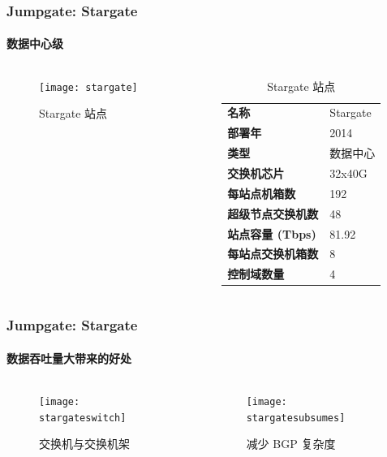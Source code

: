 \begin{frame}
    \frametitle{Jumpgate: Stargate}
    \framesubtitle{数据中心级}
    \begin{columns}
        \begin{column}{0.4\textwidth}
            \begin{figure}
                \texttt{[image: stargate]}
                \caption{Stargate 站点}
            \end{figure}
        \end{column}
        \begin{column}{0.6\textwidth}
            \begin{table}
                \begin{tabular}{>{\bfseries}ll}
                    \toprule
                    名称             & Stargate \\
                    部署年           & 2014     \\
                    类型             & 数据中心 \\
                    交换机芯片       & 32x40G   \\
                    每站点机箱数     & 192      \\
                    超级节点交换机数 & 48       \\
                    站点容量 (Tbps)  & 81.92    \\
                    每站点交换机箱数 & 8        \\
                    控制域数量       & 4        \\
                    \bottomrule
                \end{tabular}
                \caption{Stargate 站点}\label{tab:stargate}
            \end{table}
        \end{column}
    \end{columns}
\end{frame}

\begin{frame}
    \frametitle{Jumpgate: Stargate}
    \framesubtitle{数据吞吐量大带来的好处}

    \begin{columns}
        \begin{column}{0.2\textwidth}
            \begin{figure}
                \texttt{[image: stargateswitch]}
                \caption{交换机与交换机架}
            \end{figure}
        \end{column}
        \begin{column}{0.6\textwidth}
            \begin{figure}
                \texttt{[image: stargatesubsumes]}
                \caption{减少 BGP 复杂度}
            \end{figure}
        \end{column}
    \end{columns}
\end{frame}

